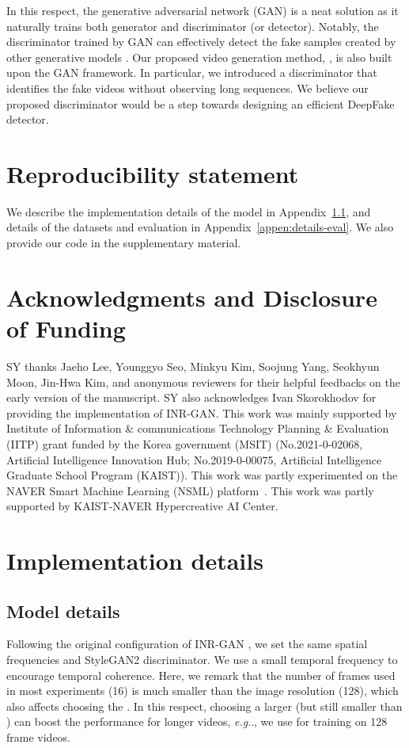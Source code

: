 \documentclass{article} \usepackage{iclr2022_conference,times}
\makeatletter
\DeclareRobustCommand\onedot{\futurelet\@let@token\@onedot}
\def\@onedot{\ifx\@let@token.\else.\null\fi\xspace}
\def\eg{\emph{e.g}\onedot} \def\Eg{\emph{E.g}\onedot}
\makeatother
\begin{document}
In this respect, the generative adversarial network (GAN) is a neat solution as it naturally trains both generator and discriminator (or detector). Notably, the discriminator trained by GAN can effectively detect the fake samples created by other generative models \citep{wang2020cnn}. Our proposed video generation method, \sname, is also built upon the GAN framework. In particular, we introduced a discriminator that identifies the fake videos without observing long sequences. We believe our proposed discriminator would be a step towards designing an efficient DeepFake detector.

\section*{Reproducibility statement}

We describe the implementation details of the model in Appendix~\ref{appen:details-model}, and details of the datasets and evaluation in Appendix~\ref{appen:details-eval}. We also provide our code in the supplementary material.

\section*{Acknowledgments and Disclosure of Funding}
SY thanks Jaeho Lee, Younggyo Seo, Minkyu Kim, Soojung Yang, Seokhyun Moon, Jin-Hwa Kim, and anonymous reviewers for their helpful feedbacks on the early version of the manuscript. SY also acknowledges Ivan Skorokhodov for providing the implementation of INR-GAN. This work was mainly supported by Institute of Information \& communications Technology Planning \& Evaluation (IITP) grant funded by the Korea government (MSIT) (No.2021-0-02068, Artificial Intelligence Innovation Hub; No.2019-0-00075, Artificial Intelligence Graduate School Program (KAIST)). This work was partly experimented on the NAVER Smart Machine Learning (NSML) platform~\citep{nsml,kim2018nsml}. This work was partly supported by KAIST-NAVER Hypercreative AI Center.




\appendix

\clearpage
\section{Implementation details}
\label{appen:details}


\subsection{Model details}
\label{appen:details-model}
Following the original configuration of INR-GAN \citep{skorokhodov2021adversarial}, we set the same spatial frequencies  and StyleGAN2 \citep{karras2020analyzing} discriminator. We use a small temporal frequency  to encourage temporal coherence. Here, we remark that the number of frames used in most experiments (16) is much smaller than the image resolution (128), which also affects choosing the . In this respect, choosing a larger  (but still smaller than ) can boost the performance for longer videos, \eg, we use  for training on 128 frame videos. 
\end{document}
